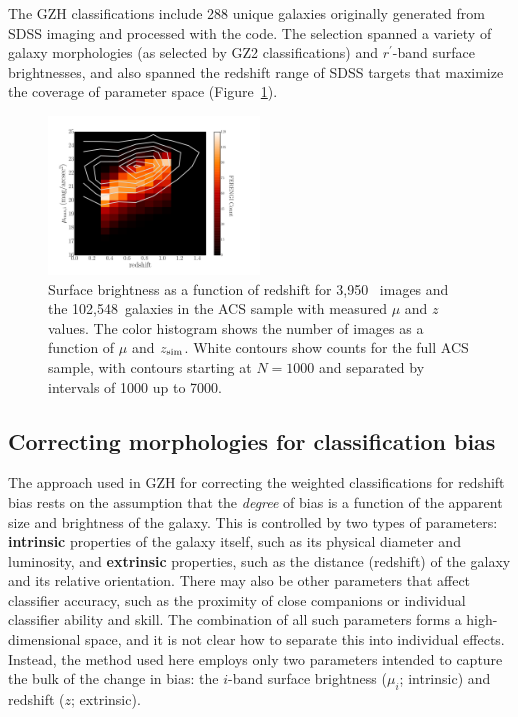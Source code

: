 \documentclass[twocolumn]{aastex6}
\begin{document}
The GZH classifications include 288 unique galaxies originally generated from
SDSS imaging and processed with the \ferengi{} code. The selection spanned a
variety of galaxy morphologies (as selected by GZ2 classifications) and
$r^\prime$-band surface brightnesses, and also spanned the redshift range of
SDSS targets that maximize the coverage of parameter space
(Figure~\ref{fig:sb_redshift}). 

\begin{figure}
\begin{center}
\includegraphics[width=0.5\textwidth]{figures/eye_of_sauron.pdf}
\caption{Surface brightness as a function of redshift for 3,950~\ferengi{}
images and the 102,548~galaxies in the ACS sample with measured $\mu$ and $z$
values. The color histogram shows the number of \ferengi{} images as a function
of $\mu$ and $z_{\rm sim}$. White contours show counts for the full ACS sample,
with contours starting at $N=1000$ and separated by intervals of 1000 up to
7000.} 
\label{fig:sb_redshift}
\end{center}
\end{figure}

\subsection{Correcting morphologies for classification bias}\label{ssec:zeta}

The approach used in GZH for correcting the weighted classifications for
redshift bias rests on the assumption that the \emph{degree} of bias is a
function of the apparent size and brightness of the galaxy.
This is controlled by two types of parameters: \textbf{intrinsic} properties of
the galaxy itself, such as its physical diameter and luminosity, and
\textbf{extrinsic} properties, such as the distance (redshift) of the galaxy
and its relative orientation. There may also be other parameters that affect
classifier accuracy, such as the proximity of close companions or 
individual classifier ability and skill. The combination of all
such parameters forms a high-dimensional space, and it is not clear how to
separate this into individual effects. Instead, the method used here employs
only two parameters intended to capture the bulk of the change in bias: the
$i$-band surface brightness ($\mu_i$; intrinsic) and redshift ($z$;
extrinsic). 
\end{document}
